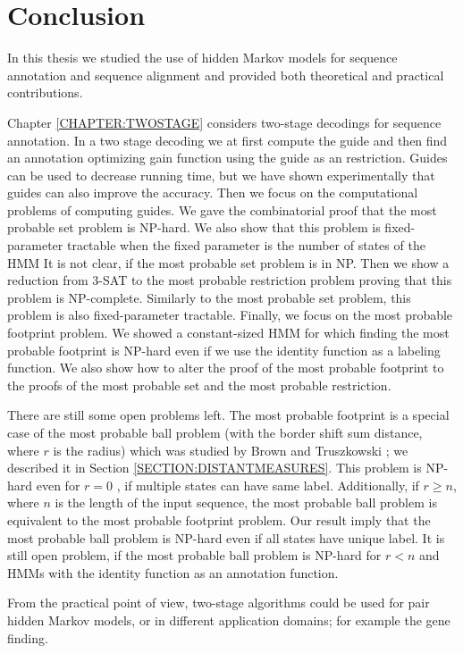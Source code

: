 \chapter{Conclusion}

In this thesis we studied the use of hidden Markov models for sequence
annotation and sequence alignment and provided both theoretical and practical
contributions.

Chapter \ref{CHAPTER:TWOSTAGE} considers two-stage decodings for sequence
annotation. In a two stage decoding we at first compute the guide and then find
an annotation optimizing gain function using the guide as an restriction. Guides
can be used to decrease running time, but we have shown experimentally that
guides can also improve the accuracy. Then we focus on the computational
problems of computing guides.  We gave the combinatorial proof that the most
probable set problem is NP-hard.  We also show that this problem is
fixed-parameter tractable when the fixed parameter is the number of states of
the HMM It is not clear, if the most probable set problem is in NP. Then we
show a reduction from 3-SAT to the most probable restriction problem proving
that this problem is NP-complete. Similarly to the most probable set problem,
this problem is also fixed-parameter tractable.  Finally, we focus on the most
probable footprint problem.  We showed a constant-sized HMM for which finding
the most probable footprint is NP-hard even if we use the identity function as
a labeling function. We also show how to alter the proof of the most probable
footprint to the proofs of the most probable set and the most probable
restriction. 

There are still some open problems left. The most probable footprint is a
special case of the most probable ball problem (with the border shift sum
distance, where $r$ is the radius) which was studied by Brown and Truszkowski
\cite{Brown2010}; we described it in Section \ref{SECTION:DISTANTMEASURES}.
This problem is NP-hard even for $r=0$ \cite{Brown2010}, if multiple states can
have same label. Additionally, if $r\geq n$, where $n$ is the length of the
input sequence, the most probable ball problem is equivalent to the most
probable footprint problem. Our result imply that the most probable ball
problem is NP-hard even if all states have unique label. It is still open
problem, if the most probable ball problem is NP-hard for $r<n$ and HMMs with
the identity function as an annotation function. 

From the practical point of view, two-stage algorithms  could be used
for pair hidden Markov models, or in different application domains; for example
the gene finding.

